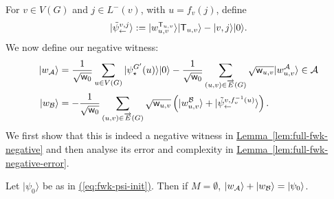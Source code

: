 \documentclass{article}
\newcommand{\eq}[1]{\hyperref[eq:#1]{(\ref*{eq:#1})}}
\newcommand{\lem}[1]{\hyperref[lem:#1]{Lemma~\ref*{lem:#1}}}
\def\ket#1{{\lvert}#1\rangle}
\renewcommand{\>}{\rangle}
\newcommand{\<}{\langle}
\renewcommand{\(}{\left(}
\renewcommand{\)}{\right)}
\def\w{{\sf w}}
\begin{document}
For $v\in V(G)$ and $j\in L^-(v)$, with $u=f_v(j)$, define
\begin{equation}
\ket{\tilde\psi_{\leftarrow}^{v,j}}:=\ket{w_{u,v}^{{\sf T}_{u,v}}}\ket{{\sf T}_{u,v}}-\ket{v,j}\ket{0}.\label{eq:tilde-psi}
\end{equation}
We now define our negative witness:
\begin{align*}
\ket{w_{\cal A}} &= \frac{1}{\sqrt{\w_0}}\sum_{u\in V(G)}\ket{\psi_{\star}^{G'}(u)}\ket{0}-\frac{1}{\sqrt{\w_0}}\sum_{(u,v)\in\overrightarrow{E}(G)}\sqrt{\w_{u,v}}\ket{w_{u,v}^{\cal A}}    \in{\cal A}\\
\ket{w_{\cal B}} &= -\frac{1}{\sqrt{\w_0}}\sum_{(u,v)\in\overrightarrow{E}(G)}\sqrt{\w_{u,v}}\left(\ket{w_{u,v}^{\cal B}}+\ket{\tilde\psi_{\leftarrow}^{v,f_v^{-1}(u)}}\right).
\end{align*}
We first show that this is indeed a negative witness in \lem{full-fwk-negative} and then analyse its error and complexity in \lem{full-fwk-negative-error}.
\begin{lemma}\label{lem:full-fwk-negative}
Let $\ket{\psi_0}$ be as in \eq{fwk-psi-init}. Then if $M=\emptyset$, $\ket{w_{\cal A}}+\ket{w_{\cal B}}=\ket{\psi_0}$.
\end{lemma}
\end{document}
